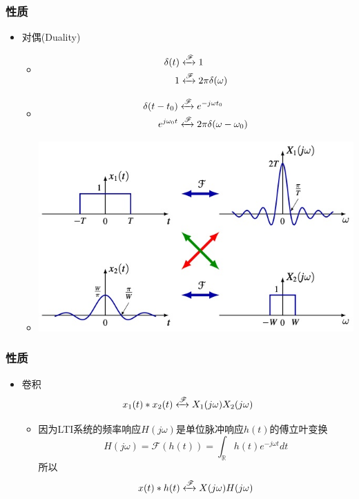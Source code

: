 \documentclass[CJKutf8,xcolor=pdftex,dvipsnames,table]{beamer}
\begin{document}
\begin{CJK*}{UTF8}{song}
  \begin{frame}
    \frametitle{性质}
    \begin{itemize}
    \item 对偶(Duality)
    	\begin{itemize}
		\item
\begin{align*}
    \delta(t) & \xleftrightarrow{\mathscr{F}} 1  \\        
        1 & \xleftrightarrow{\mathscr{F}} 2\pi\delta(\omega) 
\end{align*}    
		\item
\begin{align*}
\delta(t-t_0) & \xleftrightarrow{\mathscr{F}} e^{-j\omega t_0} \\
e^{j\omega_0 t} & \xleftrightarrow{\mathscr{F}} 2\pi\delta(\omega-\omega_0) 
\end{align*}   

		\item    
    		\begin{center}
      		\includegraphics[scale=.3]{ftduality}
    		\end{center}
		\end{itemize}      
    \end{itemize}

  \end{frame}    

	
  \begin{frame}
    \frametitle{性质}
    \begin{itemize}
    \item 卷积
    \[
    	x_1(t)*x_2(t) \xleftrightarrow{\mathscr{F}} X_1(j\omega)X_2(j\omega)
    \]
    	\begin{itemize}
		\item 因为LTI系统的频率响应$H(j\omega)$是单位脉冲响应$h(t)$的傅立叶变换
		\[
			H(j\omega)=\mathscr{F}(h(t))=\int_{\mathbb{R}}h(t)e^{-j\omega t}dt
		\]
		所以
		\[
			x(t)*h(t) \xleftrightarrow{\mathscr{F}} X(j\omega)H(j\omega)
		\]
    	\end{itemize}


\end{itemize}
\end{frame}
\end{CJK*}
\end{document}
